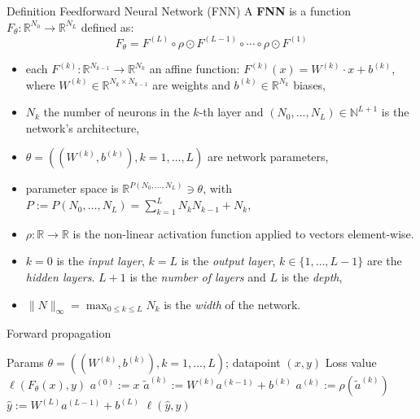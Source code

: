 \documentclass[a4paper,10pt]{article}
\newenvironment{myitemize}
{\vspace{-0.25cm}\begin{itemize}}
{\end{itemize}}
\begin{document}
\begin{small}
\begin{subbox}{Definition Feedforward Neural Network (FNN)}
    A \textbf{FNN} is a function $F_{\theta}: \mathbb{R}^{N_0} \rightarrow \mathbb{R}^{N_L}$ defined as:
$$
F_{\theta} = F^{(L)} \circ \rho \odot F^{(L-1)} \circ \cdots \circ \rho \odot F^{(1)}
$$
\vspace{-0.5cm}
\begin{myitemize}
    \item each $F^{(k)}: \mathbb{R}^{N_{k-1}} \rightarrow \mathbb{R}^{N_k}$ an affine function: $ F^{(k)}(x) = W^{(k)} \cdot x + b^{(k)} $, where $W^{(k)} \in \mathbb{R}^{N_k \times N_{k-1}}$ are weights and $b^{(k)} \in \mathbb{R}^{N_k}$ biases,
    \item $N_k$ the number of neurons in the $k$-th layer and $(N_0, \dots, N_L) \in \mathbb{N}^{L+1}$ is the network's architecture,
    \item $\theta = ((W^{(k)}, b^{(k)}), k = 1, \dots, L)$ are network parameters,
    \item parameter space is $\mathbb{R}^{P(N_0,\dots,N_L)} \ni \theta$, with $P := P(N_0, \dots, N_L) = \sum_{k=1}^{L} N_k N_{k-1} + N_k$,
    \item $\rho: \mathbb{R} \rightarrow \mathbb{R}$ is the non-linear activation function applied to vectors element-wise.
\end{myitemize}
\end{subbox}

\begin{myitemize}
    \item $k = 0$ is the \textit{input layer}, $k = L$ is the \textit{output layer}, $k \in \{1, \dots, L-1\}$ are the \textit{hidden layers}. $L + 1$ is the \textit{number of layers} and $L$ is the \textit{depth},
    \item $\|N\|_{\infty} = \max_{0 \leq k \leq L} N_k$ is the \textit{width} of the network.
\end{myitemize}

\begin{algorithm}
\footnotesize
\caption{Forward propagation}
\begin{algorithmic}[1]
\Require Params $\theta = \left( \left(W^{(k)}, b^{(k)}\right), k = 1, \dots, L \right)$; datapoint $(x, y)$
\Ensure Loss value $\ell(F_{\theta}(x), y)$
\State $a^{(0)} := x$
    \State $\tilde{a}^{(k)} := W^{(k)} a^{(k-1)} + b^{(k)}$
    \State $a^{(k)} := \rho(\tilde{a}^{(k)})$
\EndFor
\State $\hat{y} := W^{(L)} a^{(L-1)} + b^{(L)}$
\State \Return $\ell(\hat{y}, y)$
\end{algorithmic}
\end{algorithm}


\end{small}
\end{document}
